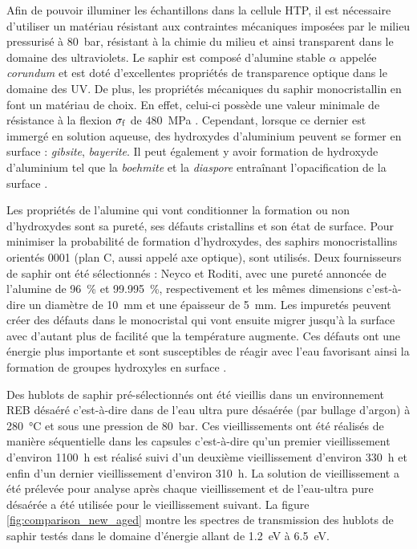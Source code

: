 \begin{refsection}
        Afin de pouvoir illuminer les échantillons dans la cellule HTP, il est nécessaire d'utiliser un 
        matériau résistant aux contraintes mécaniques imposées par le milieu pressurisé à \SI{80}{\bar}, résistant à
        la chimie du milieu et ainsi transparent dans le domaine des ultraviolets.
        Le saphir est composé d'alumine stable $\alpha$ appelée \emph{corundum} 
        et est doté d'excellentes propriétés de transparence optique dans le domaine des UV.
        De plus, les propriétés mécaniques du saphir monocristallin en font un matériau de choix. 
        En effet, celui-ci possède une valeur minimale de résistance à la flexion 
        $\rm \sigma _f$ de \SI{480}{\mega\pascal} \citep{Pishchik2009}. 
        Cependant, lorsque ce dernier est immergé en solution aqueuse, des hydroxydes d'aluminium peuvent se
        former en surface : \emph{gibsite}, \emph{bayerite}. Il peut également y avoir formation de hydroxyde 
        d'aluminium tel que la \emph{boehmite} et la \emph{diaspore} entraînant l'opacification de la 
        surface \citep{Pishchik2009,Franks2007}.

        Les propriétés de l'alumine qui vont conditionner la formation ou non d'hydroxydes sont sa pureté,
        ses défauts cristallins et son état de surface. Pour minimiser la probabilité de formation d'hydroxydes,
        des saphirs monocristallins orientés 0001 (plan C, aussi appelé axe optique), sont utilisés. 
        Deux fournisseurs de saphir ont été sélectionnés : Neyco et Roditi, avec une pureté annoncée de l'alumine  
        de 96~\% et 99.995~\%, respectivement et les mêmes dimensions c'est-à-dire un diamètre de 10~mm et une
        épaisseur de 5~mm.
        Les impuretés peuvent créer des défauts dans le monocristal qui vont ensuite migrer 
        jusqu'à la surface avec d'autant plus de facilité que la température augmente. 
        Ces défauts ont une énergie plus importante et sont susceptibles de réagir avec l'eau favorisant
        ainsi la formation de groupes hydroxyles en surface \citep{Franks2007}.

        Des hublots de saphir pré-sélectionnés ont été vieillis dans un environnement REB désaéré c'est-à-dire dans de 
        l'eau ultra pure désaérée (par bullage d'argon) à \SI{280}{\degreeCelsius} et sous une pression de \SI{80}{\bar}.
        Ces vieillissements ont été réalisés de manière séquentielle dans les capsules c'est-à-dire qu'un premier vieillissement
        d'environ \SI{1100}{\hour} est réalisé suivi d'un deuxième vieillissement d'environ \SI{330}{\hour} et enfin 
        d'un dernier vieillissement d'environ \SI{310}{\hour}. La solution de vieillissement a été prélevée pour analyse après chaque 
        vieillissement et de l'eau-ultra pure désaérée a été utilisée pour le vieillissement suivant.
        La figure \ref{fig:comparison_new_aged} montre les spectres de transmission des hublots de saphir testés dans le 
        domaine d'énergie allant de \SI{1.2}{\electronvolt} à \SI{6.5}{\electronvolt}.
        

\end{refsection}
